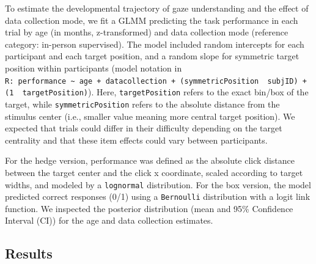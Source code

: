 \documentclass[
  man,floatsintext]{apa6}
\begin{document}
To estimate the developmental trajectory of gaze understanding and the effect of data collection mode, we fit a GLMM predicting the task performance in each trial by age (in months, z-transformed) and data collection mode (reference category: in-person supervised).
The model included random intercepts for each participant and each target position, and a random slope for symmetric target position within participants (model notation in \texttt{R:\ performance\ \textasciitilde{}\ age\ +\ datacollection\ +\ (symmetricPosition\ \textbar{}\ subjID)\ +\ (1\ \textbar{}\ targetPosition)}).
Here, \texttt{targetPosition} refers to the exact bin/box of the target, while \texttt{symmetricPosition} refers to the absolute distance from the stimulus center (i.e., smaller value meaning more central target position).
We expected that trials could differ in their difficulty depending on the target centrality and that these item effects could vary between participants.

For the hedge version, performance was defined as the absolute click distance between the target center and the click x coordinate, scaled according to target widths, and modeled by a \texttt{lognormal} distribution.
For the box version, the model predicted correct responses (0/1) using a \texttt{Bernoulli} distribution with a logit link function.
We inspected the posterior distribution (mean and 95\% Confidence Interval (CI)) for the age and data collection estimates.

\hypertarget{results}{%
\subsection{Results}\label{results}}
\end{document}

